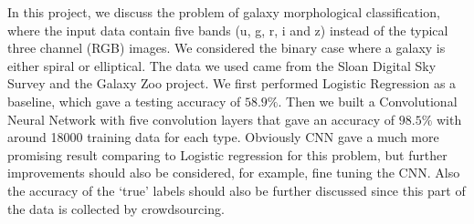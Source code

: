 In this project, we discuss the problem of galaxy morphological classification, where the input data contain five bands (u, g, r, i and z) instead of the typical three channel (RGB) images. We considered the binary case where a galaxy is either spiral or elliptical. The data we used came from the Sloan Digital Sky Survey and the Galaxy Zoo project.
We first performed Logistic Regression as a baseline, which gave a testing accuracy of $58.9\%$. Then we built a Convolutional Neural Network with five convolution layers that gave an accuracy of $98.5\%$ with around 18000 training data for each type. Obviously CNN gave a much more promising result comparing to Logistic regression for this problem, but further improvements should also be considered, for example, fine tuning the CNN. Also the accuracy of the `true' labels should also be further discussed since this part of the data is collected by crowdsourcing.